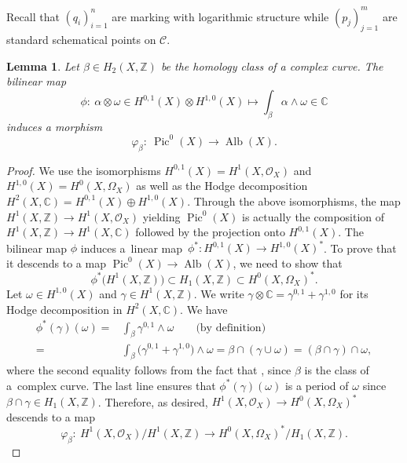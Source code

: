 \documentclass[11pt]{article}
\numberwithin{equation}{section}
\newcommand{\Pic}{\operatorname{Pic}}
\newcommand{\Alb}{\operatorname{Alb}}
\newcommand{\ZZ}{\mathbb{Z}}
\newcommand{\CC}{\mathbb{C}}
\newcommand{\C}{\mathcal{C}}
\renewcommand{\O}{\mathcal{O}}
\numberwithin{equation}{section}
\newtheorem{lem}[theo]{Lemma}
\theoremstyle{definition}
\begin{document}
Recall that $(q_i)_{i=1}^n$ are marking with logarithmic structure while $(p_j)_{j=1}^m$ are standard schematical points on $\C$.

\begin{lem}\label{lem:mapphibeta}
Let $\beta\in H_2(X,\ZZ)$ be the homology class of a complex curve. The bilinear map
\[ \phi \colon\ \alpha\otimes\omega\in H^{0,1}(X)\otimes H^{1,0}(X)\longmapsto \int_\beta \alpha\wedge \omega\in\CC \]
induces a morphism
\[ \varphi_\beta \colon\ \Pic^0(X)\longrightarrow \Alb(X). \]
\end{lem}
\begin{proof}
We use the isomorphisms $H^{0,1}(X)=H^1(X,\O_X)$ and $H^{1,0}(X)=H^0(X,\Omega_X)$ as well as the Hodge decomposition $H^2(X,\CC)=H^{0,1}(X)\oplus H^{1,0}(X)$. Through the above isomorphisms, the map $H^1(X,\ZZ)\to H^1(X,\O_X)$ yielding $\Pic^0(X)$ is actually the composition of $H^1(X,\ZZ)\to H^1(X,\CC)$ followed by the projection onto $H^{0,1}(X)$.
The bilinear map $\phi$ induces a~linear map~${\phi^*\colon H^{0,1}(X)\to H^{1,0}(X)^*}$. To prove that it descends to a map $\Pic^0(X)\to\Alb(X)$, we need to show that
\[ \phi^*\bigl(H^1(X,\ZZ)\bigr)\subset H_1(X,\ZZ)\subset H^0(X,\Omega_X)^*. \]
Let $\omega\in H^{1,0}(X)$ and $\gamma\in H^1(X,\ZZ)$. We write $\gamma\otimes\CC=\gamma^{0,1}+\gamma^{1,0}$ for its Hodge decomposition in $H^2(X,\CC)$. We have
\begin{align*}
\phi^*(\gamma)(\omega) = {}& \int_\beta \gamma^{0,1}\wedge\omega \qquad\text{(by definition)}\\
={} & \int_\beta \bigl(\gamma^{0,1}+\gamma^{1,0}\bigr)\wedge\omega
= \beta\cap (\gamma\cup\omega)
= (\beta\cap\gamma)\cap\omega,
\end{align*}
where the second equality follows from the fact that , since $\beta$ is the class of a~complex curve. The last line ensures that $\phi^*(\gamma)(\omega)$ is a period of $\omega$ since $\beta\cap\gamma\in H_1(X,\ZZ)$. Therefore, as desired, $H^1(X,\O_X)\to H^0(X,\Omega_X)^*$ descends to a map
\[ \varphi_\beta \colon\ H^1(X,\O_X)/H^1(X,\ZZ)\longrightarrow H^0(X,\Omega_X)^*/H_1(X,\ZZ). \tag*{\qed}
\]\renewcommand{\qed}{}
\end{proof}
\end{document}
